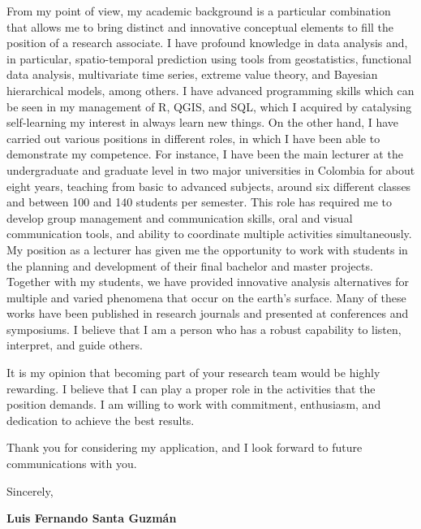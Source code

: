 \documentclass[11pt, a4paper]{awesome-cv}
\begin{document}
\begin{cvletter}
From my point of view, my academic background is a particular combination that allows me to bring distinct and innovative conceptual elements to fill the position of a research associate. I have profound knowledge in data analysis and, in particular, spatio-temporal prediction using tools from geostatistics, functional data analysis, multivariate time series, extreme value theory, and  Bayesian hierarchical models, among others. I have advanced programming skills which can be seen in my management of R, QGIS, and SQL, which I acquired by catalysing self-learning my interest in always learn new things. On the other hand, I have carried out various positions in different roles, in which I have been able to demonstrate my competence. For instance, I have been the main lecturer at the undergraduate and graduate level in two major universities in Colombia for about eight years, teaching from basic to advanced subjects, around six different classes and between 100 and 140 students per semester. This role has required me to develop group management and communication skills, oral and visual communication tools, and ability to coordinate multiple activities simultaneously. My position as a lecturer has given me the opportunity to work with students in the planning and development of their final bachelor and master projects. Together with my students, we have provided innovative analysis alternatives for multiple and varied phenomena that occur on the earth's surface. Many of these works have been published in research journals and presented at conferences and symposiums. I believe that I am a person who has a robust capability to listen, interpret, and guide others. \par
It is my opinion that becoming part of your research team would be highly rewarding. I believe that I can play a proper role in the activities that the position demands. I am willing to work with commitment, enthusiasm, and dedication to achieve the best results.\par
Thank you for considering my application, and I look forward to future communications with you.\par
Sincerely,\par
{\bf Luis Fernando Santa Guzmán}
\end{cvletter}


\end{document}
